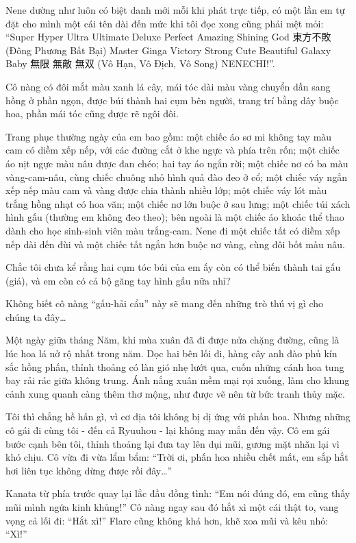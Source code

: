 \documentclass[../main.tex]{subfiles}
\begin{document}
Nene dường như luôn có biệt danh mới mỗi khi phát trực tiếp, có một lần em tự đặt cho mình một cái tên dài đến mức khi tôi đọc xong cũng phải mệt mỏi: ``Super Hyper Ultra Ultimate Deluxe Perfect Amazing Shining God 東方不敗 (Đông Phương Bất Bại) Master Ginga Victory Strong Cute Beautiful Galaxy Baby 無限 無敵 無双 (Vô Hạn, Vô Địch, Vô Song) NENECHI!''.

Cô nàng có đôi mắt màu xanh lá cây, mái tóc dài màu vàng chuyển dần sang hồng ở phần ngọn, được búi thành hai cụm bên người, trang trí bằng dây buộc hoa, phần mái tóc cũng được rẽ ngôi đôi.

Trang phục thường ngày của em bao gồm: một chiếc áo sơ mi không tay màu cam có diềm xếp nếp, với các đường cắt ở khe ngực và phía trên rốn; một chiếc áo nịt ngực màu nâu được đan chéo; hai tay áo ngắn rời; một chiếc nơ có ba màu vàng-cam-nâu, cùng chiếc chuông nhỏ hình quả đào đeo ở cổ; một chiếc váy ngắn xếp nếp màu cam và vàng được chia thành nhiều lớp; một chiếc váy lót màu trắng hồng nhạt có hoa văn; một chiếc nơ lớn buộc ở sau lưng; một chiếc túi xách hình gấu (thường em không đeo theo); bên ngoài là một chiếc áo khoác thể thao dành cho học sinh-sinh viên màu trắng-cam. Nene đi một chiếc tất có diềm xếp nếp dài đến đùi và một chiếc tất ngắn hơn buộc nơ vàng, cùng đôi bốt màu nâu.

Chắc tôi chưa kể rằng hai cụm tóc búi của em ấy còn có thể biến thành tai gấu (giả), và em còn có cả bộ găng tay hình gấu nữa nhỉ?

\chrint

Không biết cô nàng ``gấu-hải cẩu'' này sẽ mang đến những trò thú vị gì cho chúng ta đây\dots

\il

Một ngày giữa tháng Năm, khi mùa xuân đã đi được nửa chặng đường, cũng là lúc hoa lá nở rộ nhất trong năm. Dọc hai bên lối đi, hàng cây anh đào phủ kín sắc hồng phấn, thỉnh thoảng có làn gió nhẹ lướt qua, cuốn những cánh hoa tung bay rải rác giữa không trung. Ánh nắng xuân mềm mại rọi xuống, làm cho khung cảnh xung quanh càng thêm thơ mộng, như được vẽ nên từ bức tranh thủy mặc.

Tôi thì chẳng hề hấn gì, vì cơ địa tôi không bị dị ứng với phấn hoa. Nhưng những cô gái đi cùng tôi - đến cả Ryuuhou - lại không may mắn đến vậy. Cô em gái bước cạnh bên tôi, thỉnh thoảng lại đưa tay lên dụi mũi, gương mặt nhăn lại vì khó chịu. Cô vừa đi vừa lẩm bẩm: ``Trời ơi, phấn hoa nhiều chết mất, em sắp hắt hơi liên tục không dừng được rồi đây\dots''

Kanata từ phía trước quay lại lắc đầu đồng tình: ``Em nói đúng đó, em cũng thấy mũi mình ngứa kinh khủng!'' Cô nàng ngay sau đó hắt xì một cái thật to, vang vọng cả lối đi: ``Hắt xì!'' Flare cũng không khá hơn, khẽ xoa mũi và kêu nhỏ: ``Xì!''
\end{document}
